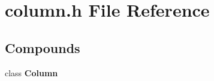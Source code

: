 \section{column.h File Reference}
\label{column.h}


\subsection*{Compounds}
\begin{CompactItemize}
\item 
class {\bf Column}
\end{CompactItemize}
